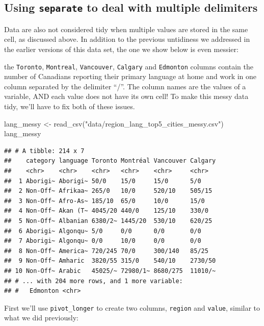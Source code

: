 \documentclass[
]{krantz}
\makeatletter
\newenvironment{Shaded}{\begin{snugshade}}{\end{snugshade}}
\newcommand{\FunctionTok}[1]{\textcolor[rgb]{0,0,0}{#1}}
\newcommand{\NormalTok}[1]{#1}
\newcommand{\OtherTok}[1]{\textcolor[rgb]{0.37,0.37,0.37}{#1}}
\newcommand{\StringTok}[1]{\textcolor[rgb]{0.5,0.5,0.5}{#1}}
\newenvironment{kframe}{%
\medskip{}
\setlength{\fboxsep}{.8em}
 \def\at@end@of@kframe{}%
 \ifinner\ifhmode%
  \def\at@end@of@kframe{\end{minipage}}%
  \begin{minipage}{\columnwidth}%
 \fi\fi%
 \def\FrameCommand##1{\hskip\@totalleftmargin \hskip-\fboxsep
 \colorbox{shadecolor}{##1}\hskip-\fboxsep
     \hskip-\linewidth \hskip-\@totalleftmargin \hskip\columnwidth}%
 \MakeFramed {\advance\hsize-\width
   \@totalleftmargin\z@ \linewidth\hsize
   \@setminipage}}%
 {\par\unskip\endMakeFramed%
 \at@end@of@kframe}
\renewenvironment{Shaded}{\begin{kframe}}{\end{kframe}}
\makeatother
\begin{document}
\hypertarget{using-separate-to-deal-with-multiple-delimiters}{%
\subsection{\texorpdfstring{Using \texttt{separate} to deal with multiple delimiters}{Using separate to deal with multiple delimiters}}\label{using-separate-to-deal-with-multiple-delimiters}}

Data are also not considered tidy when multiple values are stored in the same cell, as discussed above. In addition to the previous untidiness we addressed in the earlier versions of this data set, the one we show below is even messier:

the \texttt{Toronto}, \texttt{Montreal}, \texttt{Vancouver}, \texttt{Calgary} and \texttt{Edmonton} columns contain the number of Canadians reporting their primary language at home and work in one column separated by the delimiter ``/''. The column names are the values of a variable, AND each value does not have its own cell! To make this messy data tidy, we'll have to fix both of these issues.

\begin{Shaded}
\begin{Highlighting}[]
\NormalTok{lang\_messy }\OtherTok{\textless{}{-}} \FunctionTok{read\_csv}\NormalTok{(}\StringTok{"data/region\_lang\_top5\_cities\_messy.csv"}\NormalTok{)}
\NormalTok{lang\_messy}
\end{Highlighting}
\end{Shaded}

\begin{verbatim}
## # A tibble: 214 x 7
##    category language Toronto Montréal Vancouver Calgary
##    <chr>    <chr>    <chr>   <chr>    <chr>     <chr>  
##  1 Aborigi~ Aborigi~ 50/0    15/0     15/0      5/0    
##  2 Non-Off~ Afrikaa~ 265/0   10/0     520/10    505/15 
##  3 Non-Off~ Afro-As~ 185/10  65/0     10/0      15/0   
##  4 Non-Off~ Akan (T~ 4045/20 440/0    125/10    330/0  
##  5 Non-Off~ Albanian 6380/2~ 1445/20  530/10    620/25 
##  6 Aborigi~ Algonqu~ 5/0     0/0      0/0       0/0    
##  7 Aborigi~ Algonqu~ 0/0     10/0     0/0       0/0    
##  8 Non-Off~ America~ 720/245 70/0     300/140   85/25  
##  9 Non-Off~ Amharic  3820/55 315/0    540/10    2730/50
## 10 Non-Off~ Arabic   45025/~ 72980/1~ 8680/275  11010/~
## # ... with 204 more rows, and 1 more variable:
## #   Edmonton <chr>
\end{verbatim}

First we'll use \texttt{pivot\_longer} to create two columns, \texttt{region} and \texttt{value}, similar to what we did previously:
\end{document}

